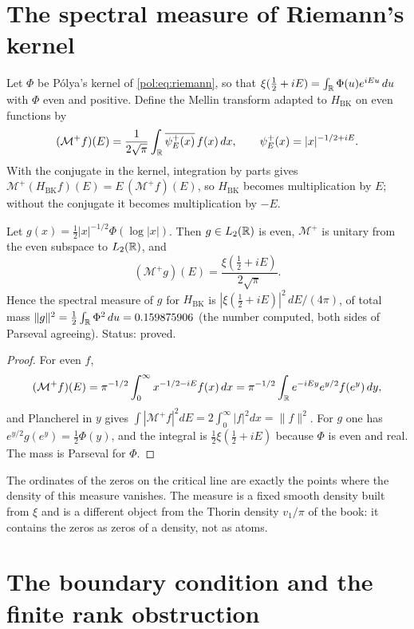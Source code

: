 \section{The spectral measure of Riemann's kernel}\label{bk:sec:mellin}

Let $\Phi$ be P\'olya's kernel of \eqref{pol:eq:riemann}, so that $\xi(\frac12+iE)=\int_{\mathbb{R}}\Phi(u)e^{iEu}\,du$ with $\Phi$ even and positive. Define the Mellin transform adapted to $H_{\mathrm{BK}}$ on even functions by
\[
(\mathcal M^+f)(E)=\frac1{2\sqrt\pi}\int_{\mathbb{R}}\overline{\psi_E^+(x)}\,f(x)\,dx,\qquad \psi_E^+(x)=|x|^{-1/2+iE}.
\]
With the conjugate in the kernel, integration by parts gives $\mathcal M^+(H_{\mathrm{BK}}f)(E)=E\,(\mathcal M^+f)(E)$, so $H_{\mathrm{BK}}$ becomes multiplication by $E$; without the conjugate it becomes multiplication by $-E$.

\begin{proposition}\label{bk:prop:mellin}
Let $g(x)=\frac12|x|^{-1/2}\Phi(\log|x|)$. Then $g\in L_2(\mathbb{R})$ is even, $\mathcal M^+$ is unitary from the even subspace to $L_2(\mathbb{R})$, and
\[
(\mathcal M^+g)(E)=\frac{\xi(\frac12+iE)}{2\sqrt\pi}.
\]
Hence the spectral measure of $g$ for $H_{\mathrm{BK}}$ is $|\xi(\frac12+iE)|^2\,dE/(4\pi)$, of total mass $\|g\|^2=\frac12\int_{\mathbb{R}}\Phi^2\,du=0.159875906$ (the number computed, both sides of Parseval agreeing). Status: proved.
\end{proposition}

\begin{proof}
For even $f$,
\[
(\mathcal M^+f)(E)=\pi^{-1/2}\int_0^\infty x^{-1/2-iE}f(x)\,dx=\pi^{-1/2}\int_{\mathbb{R}} e^{-iEy}e^{y/2}f(e^y)\,dy,
\]
and Plancherel in $y$ gives $\int|\mathcal M^+f|^2dE=2\int_0^\infty|f|^2dx=\|f\|^2$. For $g$ one has $e^{y/2}g(e^y)=\frac12\Phi(y)$, and the integral is $\frac12\xi(\frac12+iE)$ because $\Phi$ is even and real. The mass is Parseval for $\Phi$.
\end{proof}

The ordinates of the zeros on the critical line are exactly the points where the density of this measure vanishes. The measure is a fixed smooth density built from $\xi$ and is a different object from the Thorin density $v_1/\pi$ of the book: it contains the zeros as zeros of a density, not as atoms.

\section{The boundary condition and the finite rank obstruction}\label{bk:sec:nogo}

